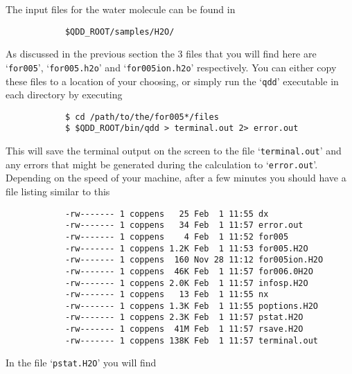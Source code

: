 \documentclass[11pt,a4paper]{article}
\begin{document}
		The input files for the water molecule can be found in 
		\begin{verbatim}
			$QDD_ROOT/samples/H2O/
		\end{verbatim}
		As discussed in the previous section the 3 files that you will find here are `\texttt{for005}', `\texttt{for005.h2o}' and `\texttt{for005ion.h2o}' respectively. You can either copy these files to a location of your choosing, or simply run the `\texttt{qdd}' executable in each directory by executing
		\begin{verbatim}
			$ cd /path/to/the/for005*/files
			$ $QDD_ROOT/bin/qdd > terminal.out 2> error.out
		\end{verbatim}
		This will save the terminal output on the screen to the file `\texttt{terminal.out}' and any errors that might be generated during the calculation to `\texttt{error.out}'. Depending on the speed of your machine, after a few minutes you should have a file listing similar to this
		\begin{verbatim}
			-rw------- 1 coppens   25 Feb  1 11:55 dx
			-rw------- 1 coppens   34 Feb  1 11:57 error.out
			-rw------- 1 coppens    4 Feb  1 11:52 for005
			-rw------- 1 coppens 1.2K Feb  1 11:53 for005.H2O
			-rw------- 1 coppens  160 Nov 28 11:12 for005ion.H2O
			-rw------- 1 coppens  46K Feb  1 11:57 for006.0H2O
			-rw------- 1 coppens 2.0K Feb  1 11:57 infosp.H2O
			-rw------- 1 coppens   13 Feb  1 11:55 nx
			-rw------- 1 coppens 1.3K Feb  1 11:55 poptions.H2O
			-rw------- 1 coppens 2.3K Feb  1 11:57 pstat.H2O
			-rw------- 1 coppens  41M Feb  1 11:57 rsave.H2O
			-rw------- 1 coppens 138K Feb  1 11:57 terminal.out
		\end{verbatim}
		In the file `\texttt{pstat.H2O}' you will find  
\end{document}
